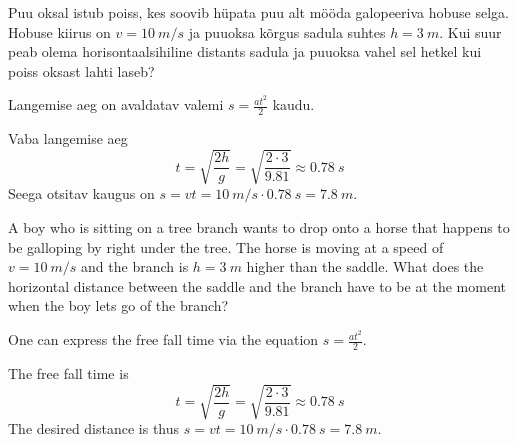 
Puu oksal istub poiss, kes soovib hüpata puu alt mööda galopeeriva hobuse selga. Hobuse kiirus on $v = \SI{10}{m/s}$ ja puuoksa kõrgus sadula suhtes $h = \SI{3}{m}$. Kui suur peab olema horisontaalsihiline distants sadula ja puuoksa vahel sel hetkel kui poiss oksast lahti laseb?

\hint
Langemise aeg on avaldatav valemi $s = \frac{at^2}{2}$ kaudu.

\solu
Vaba langemise aeg
\[
t=\sqrt{\frac{2 h}{g}}=\sqrt{\frac{2 \cdot 3}{\num{9,81}}} \approx \SI{0,78}{s}
\]
Seega otsitav kaugus on $s = vt = \SI{10}{m/s} \cdot \SI{0,78}{s} = \SI{7,8}{m}$.

A boy who is sitting on a tree branch wants to drop onto a horse that happens to be galloping by right under the tree. The horse is moving at a speed of $v = \SI{10}{m/s}$ and the branch is $h = \SI{3}{m}$ higher than the saddle. What does the horizontal distance between the saddle and the branch have to be at the moment when the boy lets go of the branch?

\hinteng
One can express the free fall time via the equation $s = \frac{at^2}{2}$.

\hintsol
The free fall time is 
\[
t=\sqrt{\frac{2 h}{g}}=\sqrt{\frac{2 \cdot 3}{\num{9,81}}} \approx \SI{0,78}{s}
\]
The desired distance is thus $s = vt = \SI{10}{m/s} \cdot \SI{0,78}{s} = \SI{7,8}{m}$.
\probend